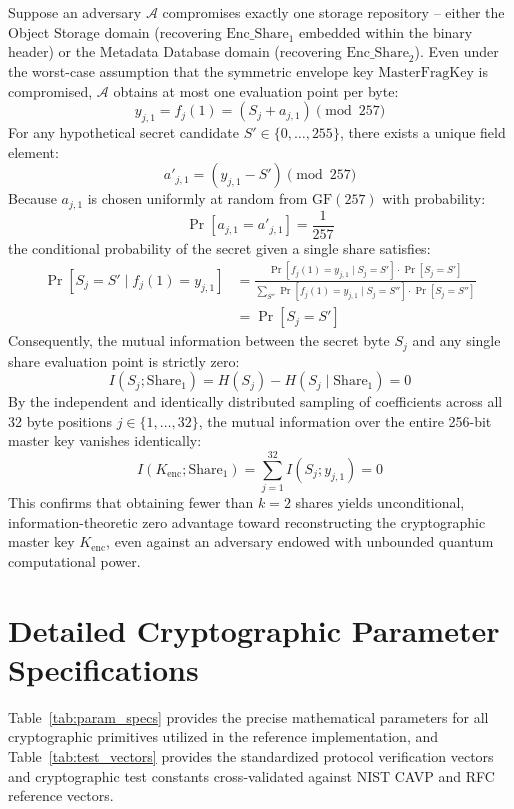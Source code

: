 \documentclass[pdflatex,sn-mathphys,Numbered]{sn-jnl}%
\theoremstyle{thmstyleone}%
\theoremstyle{thmstyletwo}%
\theoremstyle{thmstylethree}%
\begin{document}
\begin{appendices}
Suppose an adversary $\mathcal{A}$ compromises exactly one storage repository -- either the Object Storage domain (recovering $\text{Enc\_Share}_1$ embedded within the binary header) or the Metadata Database domain (recovering $\text{Enc\_Share}_2$). Even under the worst-case assumption that the symmetric envelope key $\text{MasterFragKey}$ is compromised, $\mathcal{A}$ obtains at most one evaluation point per byte:
\begin{equation}
y_{j,1} = f_j(1) = (S_j + a_{j,1}) \pmod{257}
\end{equation}
For any hypothetical secret candidate $S' \in \{0,\dots,255\}$, there exists a unique field element:
\begin{equation}
a'_{j,1} = (y_{j,1} - S') \pmod{257}
\end{equation}
Because $a_{j,1}$ is chosen uniformly at random from $\text{GF}(257)$ with probability:
\begin{equation}
\Pr[a_{j,1} = a'_{j,1}] = \frac{1}{257}
\end{equation}
the conditional probability of the secret given a single share satisfies:
\begin{equation}
\begin{split}
\Pr[S_j = S' \mid f_j(1) = y_{j,1}] &= \frac{\Pr[f_j(1) = y_{j,1} \mid S_j = S'] \cdot \Pr[S_j = S']}{\sum_{S''} \Pr[f_j(1) = y_{j,1} \mid S_j = S''] \cdot \Pr[S_j = S'']} \\
&= \Pr[S_j = S']
\end{split}
\end{equation}
Consequently, the mutual information between the secret byte $S_j$ and any single share evaluation point is strictly zero:
\begin{equation}
I(S_j; \text{Share}_1) = H(S_j) - H(S_j \mid \text{Share}_1) = 0
\end{equation}
By the independent and identically distributed sampling of coefficients across all 32 byte positions $j \in \{1,\dots,32\}$, the mutual information over the entire 256-bit master key vanishes identically:
\begin{equation}
I(K_{\text{enc}}; \text{Share}_1) = \sum_{j=1}^{32} I(S_j; y_{j,1}) = 0
\end{equation}
This confirms that obtaining fewer than $k=2$ shares yields unconditional, information-theoretic zero advantage toward reconstructing the cryptographic master key $K_{\text{enc}}$, even against an adversary endowed with unbounded quantum computational power.

\section{Detailed Cryptographic Parameter Specifications}\label{secA2}
Table~\ref{tab:param_specs} provides the precise mathematical parameters for all cryptographic primitives utilized in the reference implementation, and Table~\ref{tab:test_vectors} provides the standardized protocol verification vectors and cryptographic test constants cross-validated against NIST CAVP and RFC reference vectors.


\end{appendices}
\end{document}
